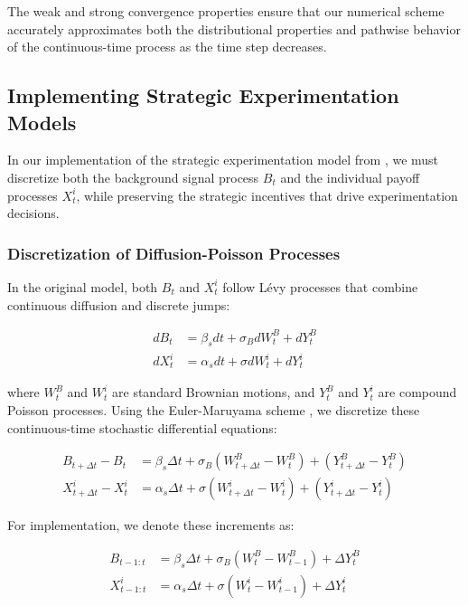 The weak and strong convergence properties ensure that our numerical scheme accurately approximates both the distributional properties and pathwise behavior of the continuous-time process as the time step decreases.

\subsection{Implementing Strategic Experimentation Models}
\label{appendix:strategic_experimentation_implementation}

In our implementation of the strategic experimentation model from \citet{keller2020undiscounted}, we must discretize both the background signal process $B_t$ and the individual payoff processes $X^i_t$, while preserving the strategic incentives that drive experimentation decisions.

\subsubsection{Discretization of Diffusion-Poisson Processes}
\label{appendix:discretization_diffusion_poisson}

In the original model, both $B_t$ and $X^i_t$ follow Lévy processes that combine continuous diffusion and discrete jumps:

\begin{align}
    dB_t   & = \beta_s dt + \sigma_B dW^B_t + dY^B_t \\
    dX^i_t & = \alpha_s dt + \sigma dW^i_t + dY^i_t
\end{align}

where $W^B_t$ and $W^i_t$ are standard Brownian motions, and $Y^B_t$ and $Y^i_t$ are compound Poisson processes. Using the Euler-Maruyama scheme \citep{platen2010numerical}, we discretize these continuous-time stochastic differential equations:

\begin{align}
    B_{t+\Delta t} - B_t     & = \beta_s \Delta t + \sigma_B (W^B_{t+\Delta t} - W^B_t) + (Y^B_{t+\Delta t} - Y^B_t) \\
    X^i_{t+\Delta t} - X^i_t & = \alpha_s \Delta t + \sigma (W^i_{t+\Delta t} - W^i_t) + (Y^i_{t+\Delta t} - Y^i_t)
\end{align}

For implementation, we denote these increments as:

\begin{align}
    B_{t-1:t}   & = \beta_s \Delta t + \sigma_B (W^B_t - W^B_{t-1}) + \Delta Y^B_t \\
    X^i_{t-1:t} & = \alpha_s \Delta t + \sigma (W^i_t - W^i_{t-1}) + \Delta Y^i_t
\end{align}

